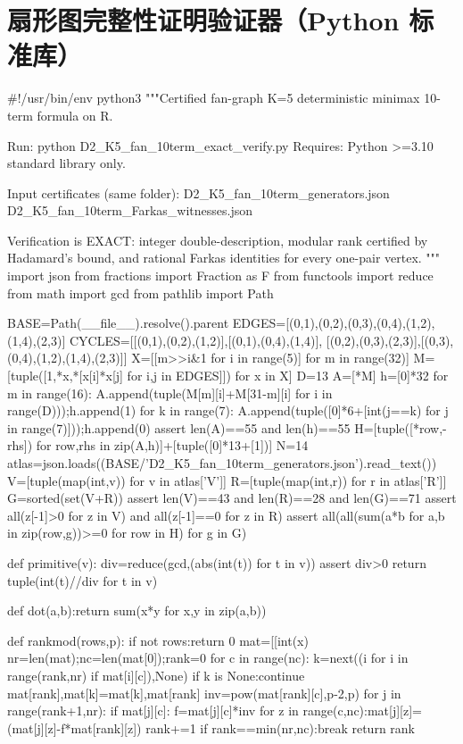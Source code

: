 \documentclass[UTF8,11pt,a4paper]{ctexart}
\begin{document}
\section{扇形图完整性证明验证器（Python 标准库）}
\begin{CodeListing}
#!/usr/bin/env python3
"""Certified fan-graph K=5 deterministic minimax 10-term formula on R.

Run: python D2_K5_fan_10term_exact_verify.py
Requires: Python >=3.10 standard library only.

Input certificates (same folder):
  D2_K5_fan_10term_generators.json
  D2_K5_fan_10term_Farkas_witnesses.json

Verification is EXACT: integer double-description, modular rank certified by
Hadamard's bound, and rational Farkas identities for every one-pair vertex.
"""
import json
from fractions import Fraction as F
from functools import reduce
from math import gcd
from pathlib import Path

BASE=Path(__file__).resolve().parent
EDGES=[(0,1),(0,2),(0,3),(0,4),(1,2),(1,4),(2,3)]
CYCLES=[[(0,1),(0,2),(1,2)],[(0,1),(0,4),(1,4)],
        [(0,2),(0,3),(2,3)],[(0,3),(0,4),(1,2),(1,4),(2,3)]]
X=[[m>>i&1 for i in range(5)] for m in range(32)]
M=[tuple([1,*x,*[x[i]*x[j] for i,j in EDGES]]) for x in X]
D=13
A=[*M]
h=[0]*32
for m in range(16):
    A.append(tuple(M[m][i]+M[31-m][i] for i in range(D)));h.append(1)
for k in range(7):
    A.append(tuple([0]*6+[int(j==k) for j in range(7)]));h.append(0)
assert len(A)==55 and len(h)==55
H=[tuple([*row,-rhs]) for row,rhs in zip(A,h)]+[tuple([0]*13+[1])]
N=14
atlas=json.loads((BASE/'D2_K5_fan_10term_generators.json').read_text())
V=[tuple(map(int,v)) for v in atlas['V']]
R=[tuple(map(int,r)) for r in atlas['R']]
G=sorted(set(V+R))
assert len(V)==43 and len(R)==28 and len(G)==71
assert all(z[-1]>0 for z in V) and all(z[-1]==0 for z in R)
assert all(all(sum(a*b for a,b in zip(row,g))>=0 for row in H) for g in G)


def primitive(v):
    div=reduce(gcd,(abs(int(t)) for t in v))
    assert div>0
    return tuple(int(t)//div for t in v)


def dot(a,b):return sum(x*y for x,y in zip(a,b))


def rankmod(rows,p):
    if not rows:return 0
    mat=[[int(x)%
    nr=len(mat);nc=len(mat[0]);rank=0
    for c in range(nc):
        k=next((i for i in range(rank,nr) if mat[i][c]),None)
        if k is None:continue
        mat[rank],mat[k]=mat[k],mat[rank]
        inv=pow(mat[rank][c],p-2,p)
        for j in range(rank+1,nr):
            if mat[j][c]:
                f=mat[j][c]*inv%
                for z in range(c,nc):mat[j][z]=(mat[j][z]-f*mat[rank][z])%
        rank+=1
        if rank==min(nr,nc):break
    return rank


\end{CodeListing}
\end{document}
